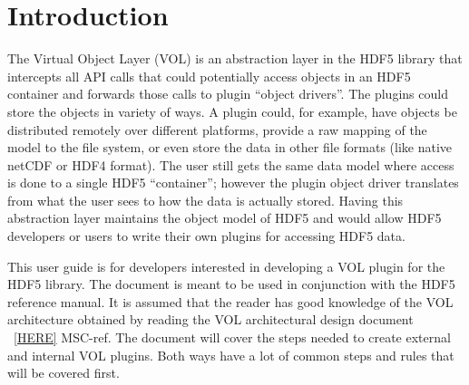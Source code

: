 

\section{Introduction}
The Virtual Object Layer (VOL) is an abstraction layer in the HDF5
library that intercepts all API calls that could potentially access
objects in an HDF5 container and forwards those calls to plugin
``object drivers''. The plugins could store the objects in variety of
ways. A plugin could, for example, have objects be distributed
remotely over different platforms, provide a raw mapping of the model
to the file system, or even store the data in other file formats (like
native netCDF or HDF4 format). The user still gets the same data model
where access is done to a single HDF5 “container”; however the plugin
object driver translates from what the user sees to how the data is
actually stored. Having this abstraction layer maintains the object
model of HDF5 and would allow HDF5 developers or users to write their
own plugins for accessing HDF5 data.

This user guide is for developers interested in developing a VOL
plugin for the HDF5 library. The document is meant to be used in
conjunction with the HDF5 reference manual. It is assumed that the
reader has good knowledge of the VOL architecture obtained by reading
the VOL architectural design document ~\ref{HERE} MSC-ref. The
document will cover the steps needed to create external and internal
VOL plugins. Both ways have a lot of common steps and rules that will
be covered first.
